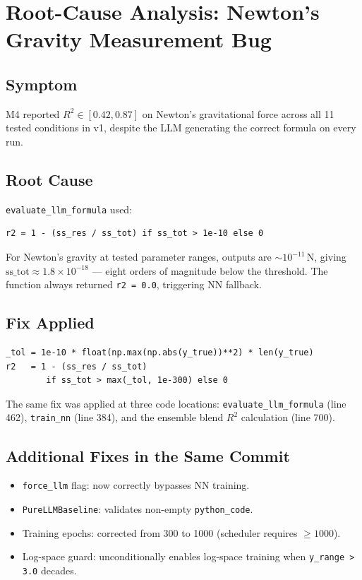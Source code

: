 \documentclass[twoside,11pt]{article}
\newcommand{\Rsq}{R^{2}}
\begin{document}
\section{Root-Cause Analysis: Newton's Gravity Measurement Bug}
\label{sec:bugfix}

\subsection{Symptom}

M4 reported $\Rsq \in [0.42, 0.87]$ on Newton's gravitational force across
all 11 tested conditions in v1, despite the LLM generating the correct formula
on every run.

\subsection{Root Cause}

\texttt{evaluate\_llm\_formula} used:
\begin{verbatim}
r2 = 1 - (ss_res / ss_tot) if ss_tot > 1e-10 else 0
\end{verbatim}
For Newton's gravity at tested parameter ranges, outputs are $\sim 10^{-11}$\,N,
giving $\mathrm{ss\_tot} \approx 1.8 \times 10^{-18}$ — eight orders of
magnitude below the threshold.  The function always returned
\texttt{r2 = 0.0}, triggering NN fallback.

\subsection{Fix Applied}

\begin{verbatim}
_tol = 1e-10 * float(np.max(np.abs(y_true))**2) * len(y_true)
r2   = 1 - (ss_res / ss_tot)
        if ss_tot > max(_tol, 1e-300) else 0
\end{verbatim}

The same fix was applied at three code locations:
\texttt{evaluate\_llm\_formula} (line 462),
\texttt{train\_nn} (line 384), and
the ensemble blend $\Rsq$ calculation (line 700).

\subsection{Additional Fixes in the Same Commit}

\begin{itemize}
  \item \texttt{force\_llm} flag: now correctly bypasses NN training.
  \item \texttt{PureLLMBaseline}: validates non-empty \texttt{python\_code}.
  \item Training epochs: corrected from 300 to 1000 (scheduler requires $\geq 1000$).
  \item Log-space guard: unconditionally enables log-space training when
    \texttt{y\_range > 3.0} decades.
\end{itemize}
\end{document}
